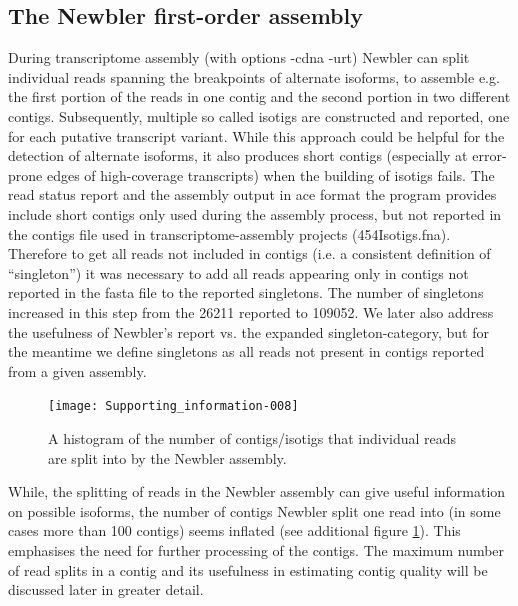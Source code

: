 \documentclass[12pt,a4paper]{article}
\begin{document}
\subsection{The Newbler first-order assembly}
\label{sec:new-fist}




During transcriptome assembly (with options -cdna -urt) Newbler can
split individual reads spanning the breakpoints of alternate isoforms,
to assemble e.g. the first portion of the reads in one contig and the
second portion in two different contigs. Subsequently, multiple so
called isotigs are constructed and reported, one for each putative
transcript variant. While this approach could be helpful for the
detection of alternate isoforms, it also produces short contigs
(especially at error-prone edges of high-coverage transcripts) when
the building of isotigs fails. The read status report and the assembly
output in ace format the program provides include short contigs only
used during the assembly process, but not reported in the contigs file
used in transcriptome-assembly projects (454Isotigs.fna). Therefore to
get all reads not included in contigs (i.e. a consistent definition of
``singleton'') it was necessary to add all reads appearing only in
contigs not reported in the fasta file to the reported singletons. The
number of singletons increased in this step from the
26211 reported to
109052. We later also address the usefulness of
Newbler's report vs. the expanded singleton-category, but for the
meantime we define singletons as all reads not present in contigs
reported from a given assembly.

\newpage
  

\begin{figure}[H]
  \centering
  
\texttt{[image: Supporting\_information-008]}

\caption{A histogram of the number of contigs/isotigs that individual
  reads are split into by the Newbler assembly.}
  \label{fig:newdist}
\end{figure}

While, the splitting of reads in the Newbler assembly can give useful
information on possible isoforms, the number of contigs Newbler split
one read into (in some cases more than 100 contigs) seems inflated
(see additional figure \ref{fig:newdist}). This emphasises the need
for further processing of the contigs. The maximum number of read
splits in a contig and its usefulness in estimating contig quality
will be discussed later in greater detail.
\end{document}
